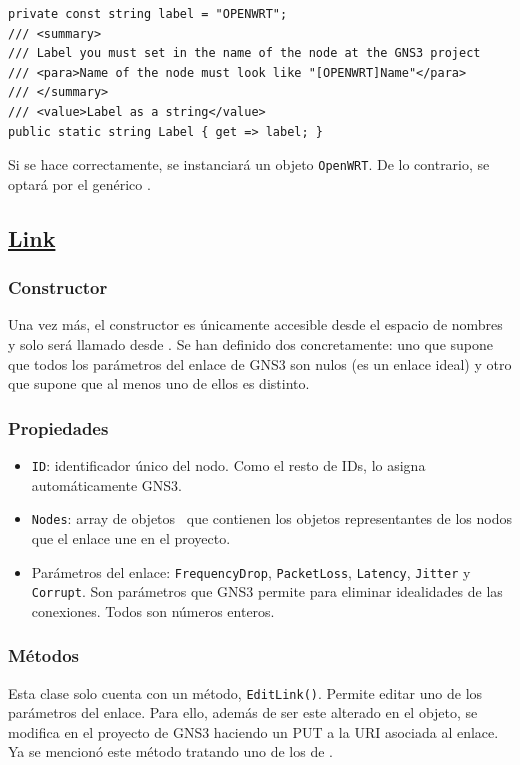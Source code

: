\begin{lstlisting}[language={[Sharp]C}, caption={Etiqueta de \texttt{OpenWRT}}, label={herederosnode1}]
private const string label = "OPENWRT";
/// <summary>
/// Label you must set in the name of the node at the GNS3 project
/// <para>Name of the node must look like "[OPENWRT]Name"</para>
/// </summary>
/// <value>Label as a string</value>
public static string Label { get => label; }
\end{lstlisting}

Si se hace correctamente, se instanciará un objeto \texttt{OpenWRT}. De lo contrario, se optará por el genérico \NODE.

\subsection[Link]{\href{https://github.com/aorestr/GNS3sharp/blob/master/link.cs}{Link}}
\subsubsection{Constructor}
Una vez más, el constructor es únicamente accesible desde el espacio de nombres y solo será llamado desde \GNSCS. Se han definido dos concretamente: uno que supone que todos los parámetros del enlace de GNS3 son nulos (es un enlace ideal) y otro que supone que al menos uno de ellos es distinto.

\subsubsection{Propiedades}
\begin{itemize}
\item \texttt{ID}: identificador único del nodo. Como el resto de IDs, lo asigna automáticamente GNS3.
\item \texttt{Nodes}: array de objetos \NODE~que contienen los objetos representantes de los nodos que el enlace une en el proyecto.
\item Parámetros del enlace: \texttt{FrequencyDrop}, \texttt{PacketLoss}, \texttt{Latency}, \texttt{Jitter} y \texttt{Corrupt}. Son parámetros que GNS3 permite para eliminar idealidades de las conexiones. Todos son números enteros.
\end{itemize}

\subsubsection{Métodos}
Esta clase solo cuenta con un método, \texttt{EditLink()}. Permite editar uno de los parámetros del enlace. Para ello, además de ser este alterado en el objeto, se modifica en el proyecto de GNS3 haciendo un PUT a la URI asociada al enlace. Ya se mencionó este método tratando uno de los de \GNSCS.

